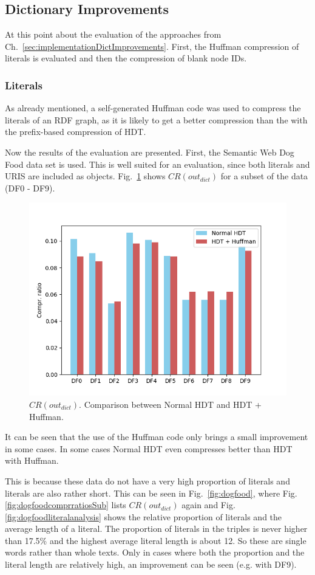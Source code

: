 \subsection{Dictionary Improvements}\label{sec:evaluationDictImprovements}

At this point  about the evaluation of the approaches from Ch.~\ref{sec:implementationDictImprovements}. First, the Huffman compression of literals is evaluated and then the compression of blank node IDs. 


\subsubsection{Literals}

As already mentioned, a self-generated Huffman code was used to compress the literals of an RDF graph, as it is likely to get a better compression than the with the prefix-based compression of HDT.

Now the results of the evaluation are presented. First, the Semantic Web Dog Food data set is used. This is well suited for an evaluation, since both literals and URIS are included as objects. Fig.~\ref{fig:dogfoodcomprratios} shows $CR(out_{dict})$ for a subset of the data (DF0 - DF9). 


\begin{figure}
	\centering
	\includegraphics[width=0.7\linewidth]{figures/4_evaluation/dogFoodComprRatios}
	\caption{$CR(out_{dict})$. Comparison between Normal HDT and HDT + Huffman.}
	\label{fig:dogfoodcomprratios}
\end{figure}

It can be seen that the use of the Huffman code only brings a small improvement in some cases. In some cases Normal HDT even compresses better than HDT with Huffman.

This is because these data do not have a very high proportion of literals and literals are also rather short. This can be seen in Fig.~\ref{fig:dogfood}, where Fig.\ref{fig:dogfoodcomprratiosSub} lists $CR(out_{dict})$ again and Fig.\ref{fig:dogfoodliteralanalysis} shows the relative proportion of literals and the average length of a literal. The proportion of literals in the triples is never higher than 17.5\% and the highest average literal length is about 12. So these are single words rather than whole texts. Only in cases where both the proportion and the literal length are relatively high, an improvement can be seen (e.g. with DF9).


